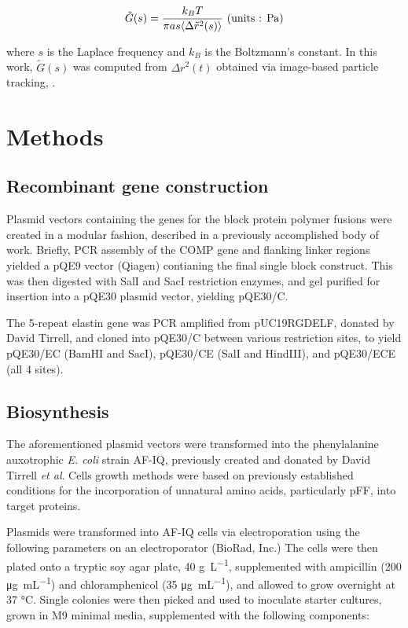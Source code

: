 \begin{refsection}
\begin{equation}
    \label{eq:stokes-einstein}
    \tilde{G}(s)=
    \frac{k_BT}{\pi a s \langle \Delta \tilde{r}^2(s) \rangle}
    \text{ (units : \si{\pascal})}
\end{equation}

where ${s}$ is the Laplace frequency and ${k_B}$ is the Boltzmann's constant. In
this work, ${\tilde{G}(s)}$ was computed from ${\Delta r^2(t)}$ obtained via
image-based particle tracking, .

\section{Methods}

\subsection{Recombinant gene construction}

Plasmid vectors containing the genes for the block protein polymer fusions were
created in a modular fashion, described in a previously accomplished body of
work.\cite{Haghpanah2009} Briefly, PCR assembly of the COMP gene and
flanking linker regions yielded a pQE9 vector (Qiagen) contianing the final
single block construct. This was then digested with SalI and SacI restriction
enzymes, and gel purified for insertion into a pQE30 plasmid vector, yielding
pQE30/C. 

The 5-repeat elastin gene was PCR amplified from pUC19RGDELF, donated by David
Tirrell, and cloned into pQE30/C between various restriction sites, to yield
pQE30/EC (BamHI and SacI), pQE30/CE (SalI and HindIII), and pQE30/ECE (all 4
sites).

\subsection{Biosynthesis}

The aforementioned plasmid vectors were transformed into the phenylalanine
auxotrophic \emph{E. coli} strain AF-IQ, previously created and donated by David
Tirrell \emph{et al}.\cite{Yoshikawa1994,} Cells growth methods were based on
previously established conditions for the incorporation of unnatural amino
acids, particularly pFF, into target
proteins.\cite{Voloshchuk2009,Yoshikawa1994}

Plasmids were transformed into AF-IQ cells via electroporation using the
following parameters on an electroporator (BioRad, Inc.) The cells were then
plated onto a tryptic soy agar plate, 40
\si{\g\per\L},
supplemented with ampicillin (200 
\si{\ug\per\mL})
and chloramphenicol (35
\si{\ug\per\mL}), and
allowed to grow overnight at 37 \si{\celsius}. Single colonies were then picked
and used to inoculate starter cultures, grown in M9 minimal media, supplemented
with the following components:


\end{refsection}
